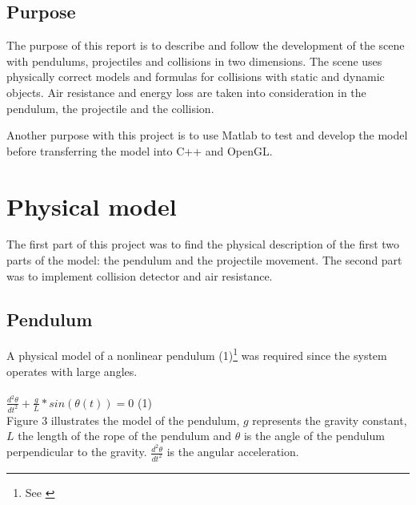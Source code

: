 \documentclass[a4paper,12pt,twoside,english]{article}
\begin{document}
\subsection{Purpose}
The purpose of this report is to describe and follow the development of the scene with pendulums, projectiles and collisions in two dimensions. The scene uses physically correct models and formulas for collisions with static and dynamic objects. Air resistance and energy loss are taken into consideration in the pendulum, the projectile and the collision.

Another purpose with this project is to use Matlab to test and develop the model before transferring the model into C++ and OpenGL. 

\section{Physical model}
The first part of this project was to find the physical description of the first two parts of the model: the pendulum and the projectile movement. The second part was to implement collision detector and air resistance. 
\subsection{Pendulum}
A physical model of a nonlinear pendulum (1)\footnote{See \cite[p.~395-398]{Hal:10}} was required since the system operates with large angles. \\ \\
$\frac{d^2\theta}{dt^2} + \frac{g}{L}*sin(\theta(t)) = 0$ \hfill (1) \\  

Figure 3 illustrates the model of the pendulum, $g$ represents the gravity constant, $L$ the length of the rope of the pendulum and $\theta$ is the angle of the pendulum perpendicular to the gravity.  $\frac{d^2\theta}{dt^2}$ is the angular acceleration.
\end{document}
